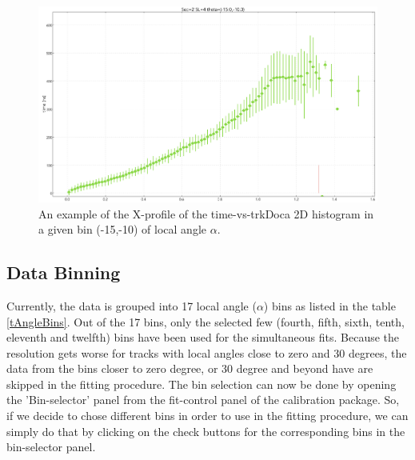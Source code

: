 \documentclass[12pt,epsfig]{article}
\begin{document}
\begin{figure}
    \centering
    \includegraphics[width=1.0\textwidth]{Figures/time_vs_trkDocaXProfileExample_Sec2_SL4_th_m15_m10.png}
    \caption{An example of the X-profile of  the time-vs-trkDoca 2D histogram in a given bin (-15,-10) of local angle $\alpha$.}
    \label{fTimeVsTrkDocaXProfile}
\end{figure}


\subsection{Data Binning}

Currently, the data is grouped into 17 local angle ($\alpha$) bins as listed in the table \ref{tAngleBins}. Out of the 17 bins, only the selected few (fourth, fifth, sixth, tenth, eleventh and twelfth)  bins have been used for the simultaneous fits. Because the resolution gets worse for tracks with local angles close to zero and 30 degrees, the data from the bins closer to zero degree, or 30 degree and beyond have are skipped in the fitting procedure. The bin selection can now be done by opening the 'Bin-selector' panel from the fit-control panel of the calibration package. So, if we decide to chose different bins in order to use in the fitting procedure, we can simply do that by clicking on the check buttons for the corresponding bins in the bin-selector panel.
\end{document}
